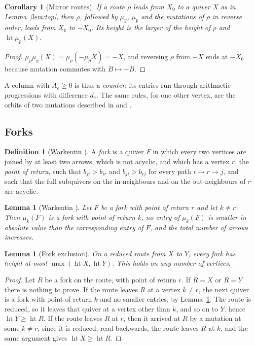 \documentclass[11pt]{amsart}
\newtheorem{lemma}[theorem]{Lemma}
\newtheorem{corollary}[theorem]{Corollary}
\theoremstyle{definition}
\newtheorem{definition}[theorem]{Definition}
\theoremstyle{remark}
\newcommand{\htt}{\operatorname{ht}}
\begin{document}
\begin{corollary}[Mirror routes]\label{cor:mirror}
If a route $\rho$ leads from $X_0$ to a quiver $X$ as in Lemma~\ref{lem:top}, then $\rho$, followed by $\mu_y$, $\mu_p$ and the mutations of $\rho$ in reverse order, leads from $X_0$ to $-X_0$. Its height is the larger of the height of $\rho$ and $\htt\mu_p(X)$.
\end{corollary}
\begin{proof}
$\mu_p\mu_y(X)=\mu_p(-\mu_p X)=-X$, and reversing $\rho$ from $-X$ ends at $-X_0$ because mutation commutes with $B\mapsto-B$.
\end{proof}

A column with $A_e\ge0$ is thus a \emph{counter}: its entries run through arithmetic progressions with difference $d_e$. The same rules, for one other vertex, are the orbits of two mutations described in \cite[Theorem~1.3]{Sou} and \cite[\S3]{FN-long}.

\subsection{Forks}\label{sec:forks}
\begin{definition}[{Warkentin \cite[Def.~2.1]{War}}]\label{def:fork}
A \emph{fork} is a quiver $F$ in which every two vertices are joined by at least two arrows, which is not acyclic, and which has a vertex $r$, the \emph{point of return}, such that $b_{ji}>b_{ir}$ and $b_{ji}>b_{rj}$ for every path $i\to r\to j$, and such that the full subquivers on the in-neighbours and on the out-neighbours of $r$ are acyclic.
\end{definition}

\begin{lemma}[{Warkentin \cite[Lemma~2.5 and its proof]{War}}]\label{lem:fork}
Let $F$ be a fork with point of return $r$ and let $k\ne r$. Then $\mu_k(F)$ is a fork with point of return $k$, no entry of $\mu_k(F)$ is smaller in absolute value than the corresponding entry of $F$, and the total number of arrows increases.
\end{lemma}

\begin{lemma}[Fork exclusion]\label{lem:forkexcl}
On a reduced route from $X$ to $Y$, every fork has height at most $\max(\htt X,\htt Y)$. This holds on any number of vertices.
\end{lemma}
\begin{proof}
Let $R$ be a fork on the route, with point of return $r$. If $R=X$ or $R=Y$ there is nothing to prove. If the route leaves $R$ at a vertex $k\ne r$, the next quiver is a fork with point of return $k$ and no smaller entries, by Lemma~\ref{lem:fork}. The route is reduced, so it leaves that quiver at a vertex other than $k$, and so on to $Y$; hence $\htt Y\ge\htt R$. If the route leaves $R$ at $r$, then it arrived at $R$ by a mutation at some $k\ne r$, since it is reduced; read backwards, the route leaves $R$ at $k$, and the same argument gives $\htt X\ge\htt R$.
\end{proof}
\end{document}
